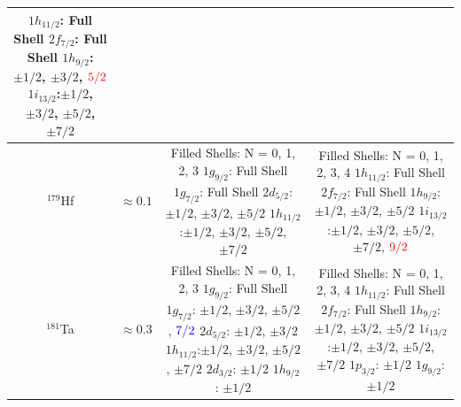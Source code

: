 \documentclass[8pt,a4paper, twoside]{report}
\begin{document}
\begin{table}[htbp]
\begin{adjustwidth}{-3cm}{-3cm}
\begin{tabular}{|c|c|c|c|}
{    $1h_{11/2}$: Full Shell \\
    $2f_{7/2}$: Full Shell \\
    $1h_{9/2}$: $\pm 1/2$, $\pm 3/2$, $\textcolor{red}{5/2}$ \\
    $1i_{13/2}$:$\pm 1/2$, $\pm 3/2$, $\pm 5/2$, $\pm 7/2$} \\
\midrule
$^{179}$Hf & $\approx 0.1$
    &  \pbox{20cm}{Filled Shells: N = 0, 1, 2, 3 \\
    $1g_{9/2}$: Full Shell \\
    $1g_{7/2}$: Full Shell \\
    $2d_{5/2}$: $\pm 1/2$, $\pm 3/2$, $\pm 5/2$ \\
    $1h_{11/2}$:$\pm 1/2$, $\pm 3/2$, $\pm 5/2$, $\pm 7/2$}          
    &  \pbox{20cm}{Filled Shells: N = 0, 1, 2, 3, 4 \\
    $1h_{11/2}$: Full Shell \\
    $2f_{7/2}$: Full Shell \\
    $1h_{9/2}$: $\pm 1/2$, $\pm 3/2$, $\pm 5/2$ \\
    $1i_{13/2}$:$\pm 1/2$, $\pm 3/2$, $\pm 5/2$, $\pm 7/2$, $\textcolor{red}{9/2}$} \\
\midrule
$^{181}$Ta & $\approx 0.3$
    &  \pbox{20cm}{Filled Shells: N = 0, 1, 2, 3 \\
    $1g_{9/2}$: Full Shell \\
    $1g_{7/2}$: $\pm 1/2$, $\pm 3/2$, $\pm 5/2$, $\textcolor{blue}{7/2}$ \\
    $2d_{5/2}$: $\pm 1/2$, $\pm 3/2$ \\
    $1h_{11/2}$:$\pm 1/2$, $\pm 3/2$, $\pm 5/2$, $\pm 7/2$ \\
    $2d_{3/2}$: $\pm 1/2$ \\
    $1h_{9/2}$: $\pm 1/2$}              
    &  \pbox{20cm}{Filled Shells: N = 0, 1, 2, 3, 4 \\
    $1h_{11/2}$: Full Shell \\
    $2f_{7/2}$: Full Shell \\
    $1h_{9/2}$: $\pm 1/2$, $\pm 3/2$, $\pm {5/2}$ \\
    $1i_{13/2}$:$\pm 1/2$, $\pm 3/2$, $\pm 5/2$, $\pm 7/2$ \\
    $1p_{3/2}$: $\pm 1/2$ \\
    $1g_{9/2}$: $\pm 1/2$} \\
\bottomrule
\bottomrule

\end{tabular}
\end{adjustwidth}
\end{table}
\end{document}
